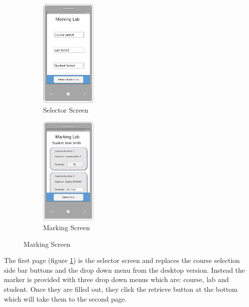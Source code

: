 \documentclass[11pt]{report}
\begin{document}
\begin{figure}[H]
\caption{Marking Page: Mobile Designs}
\label{fig:marking-mobile}
\centering
\begin{subfigure}[c]{0.45\textwidth}
    \centering
    \includegraphics[width=0.3\textwidth]{images/design/marking-select-mobile.png}
    \caption{Selector Screen}
    \label{fig:design-marking-select-mb}
\end{subfigure}
\hfill
\begin{subfigure}[c]{0.45\textwidth}
    \centering
    \includegraphics[width=0.3\textwidth]{images/design/marking-mobile.png}
    \caption{Marking Screen}
    \label{fig:design-marking-mb}
\end{subfigure}
\end{figure}


\noindent The first page (figure \ref{fig:design-marking-select-mb}) is the selector screen and replaces the course selection side bar buttons and the drop down menu from the desktop version. Instead the marker is provided with three drop down menus which are: course, lab and student. Once they are filled out, they click the retrieve button at the bottom which will take them to the second page.
\end{document}
